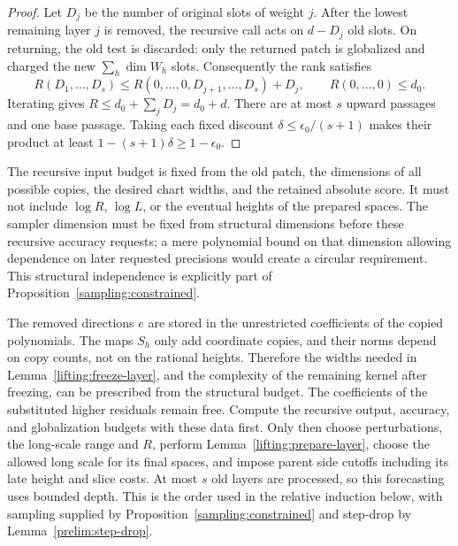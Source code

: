 \begin{proof}
Let $D_j$ be the number of original slots of weight $j$.
After the lowest remaining layer $j$ is removed, the recursive call
acts on $d-D_j$ old slots.  On returning, the old test is discarded:
only the returned patch is globalized and charged the new
$\sum_h\dim W_h$ slots.  Consequently the rank satisfies
\[
 R(D_1,\ldots,D_s)
       \le R(0,\ldots,0,D_{j+1},\ldots,D_s)+D_j,
 \qquad R(0,\ldots,0)\le d_0.
\]
Iterating gives
$R\le d_0+\sum_jD_j=d_0+d$.
There are at most $s$ upward passages and one base passage.  Taking
each fixed discount $\delta\le\epsilon_0/(s+1)$ makes their product
at least $1-(s+1)\delta\ge1-\epsilon_0$.
\end{proof}

\begin{remark}
\label{lifting:relative-gap}
The recursive input budget is fixed from the old
patch, the dimensions of all possible copies, the desired chart
widths, and the retained absolute score.  It must not include
$\log R$, $\log L$, or the eventual heights of the prepared spaces.
The sampler dimension must be fixed from structural dimensions
before these recursive accuracy requests; a mere polynomial bound
on that dimension allowing dependence on later requested precisions
would create a circular requirement.  This structural independence
is explicitly part of Proposition~\ref{sampling:constrained}.

The removed directions $e$ are stored in the unrestricted
coefficients of the copied polynomials.  The maps $S_h$ only add
coordinate copies, and their norms depend on copy counts, not on
the rational heights.  Therefore the widths needed in
Lemma~\ref{lifting:freeze-layer}, and the complexity of the remaining
kernel after freezing, can be prescribed from the structural budget.
The coefficients of the substituted higher residuals remain free.
Compute the recursive output, accuracy, and globalization budgets
with these data first.  Only then choose perturbations, the long-scale
range and $R$, perform Lemma~\ref{lifting:prepare-layer}, choose the
allowed long scale for its final spaces, and impose parent side
cutoffs including its late height and slice costs.  At most $s$ old
layers are processed, so this forecasting uses bounded depth.
This is the order used in the relative induction below, with sampling
supplied by Proposition~\ref{sampling:constrained} and step-drop by
Lemma~\ref{prelim:step-drop}.
\end{remark}

